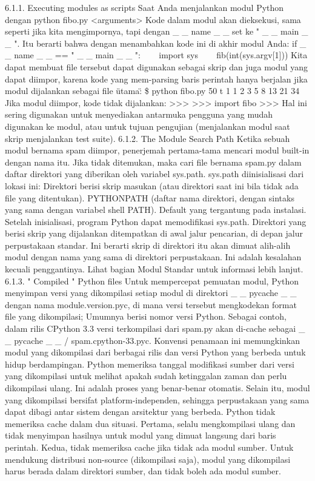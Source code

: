 6.1.1. Executing modules as scripts  
Saat Anda menjalankan modul Python dengan  
python fibo.py <arguments>  
Kode dalam modul akan dieksekusi, sama seperti jika kita mengimpornya, tapi dengan    \_     \_  name   \_     \_   set ke "   \_     \_  main   \_     \_  ". Itu berarti bahwa dengan menambahkan kode ini di akhir modul Anda: 
if    \_     \_  name   \_     \_   == "   \_     \_  main   \_     \_  ":  
~~~ import sys 
~~~ fib(int(sys.argv[1])) 
Kita dapat membuat file tersebut dapat digunakan sebagai skrip dan juga modul yang dapat diimpor, karena kode yang mem-parsing baris perintah hanya berjalan jika modul dijalankan sebagai file \"utama\":  
   \$   python fibo.py 50 t 
1 1 2 3 5 8 13 21 34  
Jika modul diimpor, kode tidak dijalankan:  
>>>  
>>> import fibo  
>>>  
Hal ini sering digunakan untuk menyediakan antarmuka pengguna yang mudah digunakan ke modul, atau untuk tujuan pengujian (menjalankan modul saat skrip menjalankan test suite). 
6.1.2. The Module Search Path 
Ketika sebuah modul bernama spam diimpor, penerjemah pertama-tama mencari modul built-in dengan nama itu. Jika tidak ditemukan, maka cari file bernama spam.py dalam daftar direktori yang diberikan oleh variabel sys.path. sys.path diinisialisasi dari lokasi ini:  
Direktori berisi skrip masukan (atau direktori saat ini bila tidak ada file yang ditentukan).  
PYTHONPATH (daftar nama direktori, dengan sintaks yang sama dengan variabel shell PATH).  
Default yang tergantung pada instalasi. 
Setelah inisialisasi, program Python dapat memodifikasi sys.path. Direktori yang berisi skrip yang dijalankan ditempatkan di awal jalur pencarian, di depan jalur perpustakaan standar. Ini berarti skrip di direktori itu akan dimuat alih-alih modul dengan nama yang sama di direktori perpustakaan. Ini adalah kesalahan kecuali penggantinya. Lihat bagian Modul Standar untuk informasi lebih lanjut.  
6.1.3.   " Compiled  "  Python files  
Untuk mempercepat pemuatan modul, Python menyimpan versi yang dikompilasi setiap modul di direktori    \_     \_  pycache   \_     \_   dengan nama module.version.pyc, di mana versi tersebut mengkodekan format file yang dikompilasi; Umumnya berisi nomor versi Python. Sebagai contoh, dalam rilis CPython 3.3 versi terkompilasi dari spam.py akan di-cache sebagai    \_     \_  pycache    \_     \_   / spam.cpython-33.pyc. Konvensi penamaan ini memungkinkan modul yang dikompilasi dari berbagai rilis dan versi Python yang berbeda untuk hidup berdampingan.  
Python memeriksa tanggal modifikasi sumber dari versi yang dikompilasi untuk melihat apakah sudah ketinggalan zaman dan perlu dikompilasi ulang. Ini adalah proses yang benar-benar otomatis. Selain itu, modul yang dikompilasi bersifat platform-independen, sehingga perpustakaan yang sama dapat dibagi antar sistem dengan arsitektur yang berbeda. Python tidak memeriksa cache dalam dua situasi. Pertama, selalu mengkompilasi ulang dan tidak menyimpan hasilnya untuk modul yang dimuat langsung dari baris perintah. Kedua, tidak memeriksa cache jika tidak ada modul sumber. Untuk mendukung distribusi non-source (dikompilasi saja), modul yang dikompilasi harus berada dalam direktori sumber, dan tidak boleh ada modul sumber. 
